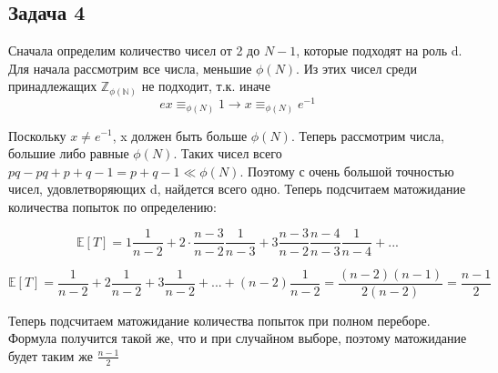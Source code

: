 \documentclass[a4paper,14pt]{article} %
\begin{document}
\subsection{Задача 4}
Сначала определим количество чисел от 2 до $N - 1$, которые подходят на роль d.
Для начала рассмотрим все числа, меньшие $\phi(N)$. Из этих чисел среди принадлежащих $\mathds{Z_{\phi(N)}}$ не подходит, т.к. иначе
\begin{equation*}
	ex \equiv_{\phi(N)} 1 \rightarrow x \equiv_{\phi(N)} e^{-1}
\end{equation*}

Поскольку $x \not = e^{-1}$, x должен быть больше $\phi(N)$. Теперь рассмотрим числа, большие либо равные $\phi(N)$.
Таких чисел всего $pq - pq + p + q - 1 = p + q -1 \ll \phi(N)$. Поэтому с очень большой точностью чисел, удовлетворяющих d, найдется всего одно. 
Теперь подсчитаем матожидание количества попыток по определению:

\begin{equation*}
	\mathds{E}[T] = 1 \frac{1}{n-2} + 2 \cdot \frac{n-3}{n-2}\frac{1}{n-3} + 3 \frac{n-3}{n-2}\frac{n-4}{n-3}\frac{1}{n-4}+...
\end{equation*}

\begin{equation*}
	\mathds{E}[T]= \frac{1}{n-2} + 2\frac{1}{n-2}+3\frac{1}{n-2} +...+ (n-2)\frac{1}{n-2} = \frac{(n-2)(n-1)}{2(n-2)} = \frac{n-1}{2}
\end{equation*}

Теперь подсчитаем матожидание количества попыток при полном переборе. Формула получится такой же, что и при случайном выборе, поэтому матожидание будет таким же $\frac{n-1}{2}$
\end{document}
